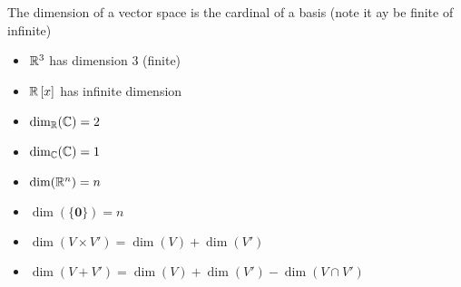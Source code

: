 \begin{definition}[Dimension]
	The dimension of a vector space is the cardinal of a basis (note it ay be finite of infinite)
\end{definition}
\begin{example}
	\begin{itemize}
		\item $\mathbb{R}^3$ has dimension 3 (finite)
		\item $\mathbb{R}\left[ x \right]$ has infinite dimension
		\item $\dim_{\mathbb{R}}(\mathbb{C})=2$
		\item $\dim_{\mathbb{C}}(\mathbb{C})=1$
		\item $\dim(\mathbb{R}^n)=n$
		\item $\dim(\{\textbf{0}\})=n$
		
	\end{itemize}
\end{example}
\begin{property}
	\begin{itemize}
		\item $\dim(V \times V')=\dim(V)+\dim(V')$
		\item $\dim(V + V')=\dim(V)+\dim(V')-\dim(V \cap V')$
	\end{itemize}
\end{property}




